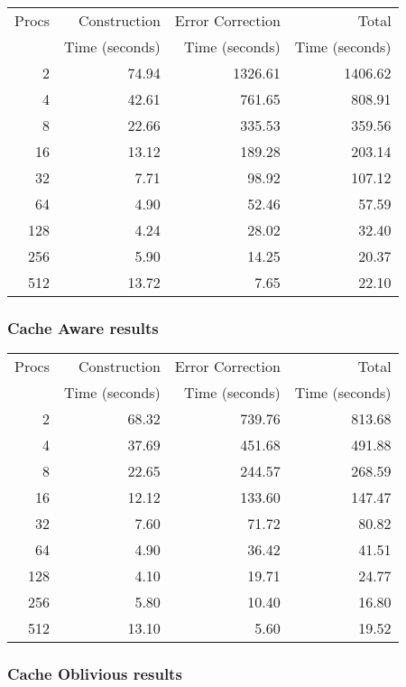\documentclass[integrals, nointegrals, article, 12pt, a4paper]{article}
\begin{document}
\begin{center}
\begin{tabular}{rrrr}
\hline
Procs & Construction & Error Correction & Total\\
 & Time (seconds) & Time (seconds) & Time (seconds)\\
\hline
2 & 74.94 & 1326.61 & 1406.62\\
4 & 42.61 & 761.65 & 808.91\\
8 & 22.66 & 335.53 & 359.56\\
16 & 13.12 & 189.28 & 203.14\\
32 & 7.71 & 98.92 & 107.12\\
64 & 4.90 & 52.46 & 57.59\\
128 & 4.24 & 28.02 & 32.40\\
256 & 5.90 & 14.25 & 20.37\\
512 & 13.72 & 7.65 & 22.10\\
\hline
\end{tabular}
\end{center}

\subsubsection{Cache Aware results}
\label{sec-2-2-2}

\begin{center}
\begin{tabular}{rrrr}
\hline
Procs & Construction & Error Correction & Total\\
 & Time (seconds) & Time (seconds) & Time (seconds)\\
\hline
2 & 68.32 & 739.76 & 813.68\\
4 & 37.69 & 451.68 & 491.88\\
8 & 22.65 & 244.57 & 268.59\\
16 & 12.12 & 133.60 & 147.47\\
32 & 7.60 & 71.72 & 80.82\\
64 & 4.90 & 36.42 & 41.51\\
128 & 4.10 & 19.71 & 24.77\\
256 & 5.80 & 10.40 & 16.80\\
512 & 13.10 & 5.60 & 19.52\\
\hline
\end{tabular}
\end{center}
\subsubsection{Cache Oblivious results}
\label{sec-2-2-3}
\end{document}
